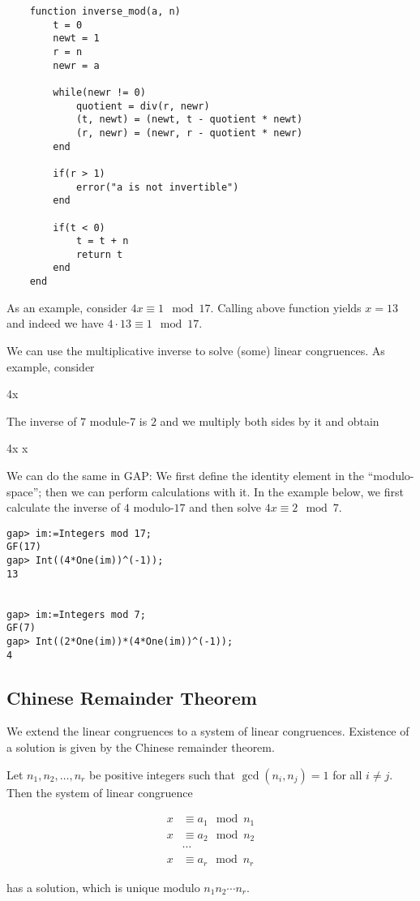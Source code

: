 \begin{verbatim}
    function inverse_mod(a, n)
        t = 0
        newt = 1
        r = n
        newr = a

        while(newr != 0)
            quotient = div(r, newr)
            (t, newt) = (newt, t - quotient * newt) 
            (r, newr) = (newr, r - quotient * newr)
        end

        if(r > 1)
            error("a is not invertible")
        end

        if(t < 0)
            t = t + n
            return t
        end
    end
\end{verbatim}

As an example, consider $4x \equiv 1 \mod 17$. Calling above function yields $x = 13$ and indeed we have $4 \cdot 13 \equiv 1 \mod 17$.

We can use the multiplicative inverse to solve (some) linear congruences. As example, consider

\bee
4x  
\eee

The inverse of $7$ module-$7$ is $2$ and we multiply both sides by it and obtain

 \cdot 4x    \rightarrow x  
\eee

We can do the same in GAP: We first define the identity element in the ``modulo-space''; then we can perform calculations with it. In the example below, we first calculate the inverse of $4$ modulo-$17$ and then solve $4x \equiv 2 \mod 7$.

\begin{verbatim}
gap> im:=Integers mod 17;
GF(17)
gap> Int((4*One(im))^(-1));
13


gap> im:=Integers mod 7;
GF(7)
gap> Int((2*One(im))*(4*One(im))^(-1));
4
\end{verbatim}



\subsection{Chinese Remainder Theorem}

We extend the linear congruences to a system of linear congruences. Existence of a solution is given by the Chinese remainder theorem.

\begin{theorem}
    Let $n_1, n_2, \ldots, n_r$ be positive integers such that $\gcd(n_i, n_j) = 1$ for all $i \neq j$. Then the system of linear congruence

    \begin{align*}
        x &\equiv a_1 \mod n_1 \\
        x &\equiv a_2 \mod n_2 \\
        & \cdots \\
        x &\equiv a_r \mod n_r
    \end{align*}

    has a solution, which is unique modulo $n_1 n_2 \cdots n_r$.
\end{theorem}

